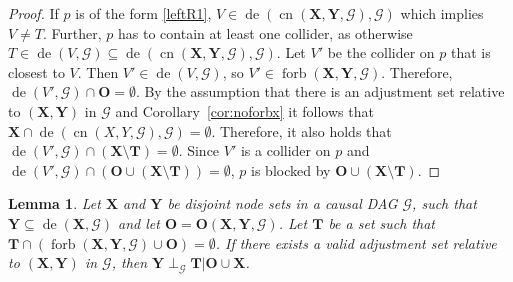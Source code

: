 \documentclass[11pt,a4paper]{article}
\newtheorem{Lemma}[Satz]{Lemma}
\theoremstyle{definition}
\theoremstyle{remark}
\DeclareMathOperator{\Forbb}{forb}
\DeclareMathOperator{\de}{de}
\DeclareMathOperator{\CN}{cn}
\newcommand{\g}[1][G]{\mathcal{#1}}
\newcommand{\fb}[2][X,Y]{\Forbb(\mathbf{#1},#2)}
\newcommand{\cn}[2][X,Y]{\CN(#1,#2)}
\newcommand{\cnb}[2][X,Y]{\CN(\mathbf{#1},#2)}
\newcommand{\optb}[2][X,Y]{\mathbf{O}(\mathbf{#1},#2)}
\begin{document}
\begin{proof}
	If $p$ is of the form \ref{leftR1}, $V \in \de(\cnb{\g},\g)$ which implies $V \neq T$. Further, $p$ has to contain at least one collider, as otherwise $T \in \de(V,\g) \subseteq \de(\cnb{\g},\g)$. Let $V'$ be the collider on $p$ that is closest to $V$.  Then $V' \in \de(V,\g)$, so $V' \in \fb{\g}$. Therefore, $\de(V',\g) \cap \mathbf{O} = \emptyset$. 
	By the assumption that there is an adjustment set relative to $(\mathbf{X,Y})$ in $\g$ and Corollary~\ref{cor:noforbx} it follows that $\mathbf{X} \cap \de(\cn{\g},\g) = \emptyset$. Therefore, it also holds that $\de(V',\g) \cap (\mathbf{X} \setminus \mathbf{T}) = \emptyset$. 
	Since $V'$ is a collider on $p$ and $\de(V',\g) \cap ( \mathbf{O} \cup (\mathbf{X} \setminus \mathbf{T})) = \emptyset$, $p$ is blocked by $\mathbf{O} \cup (\mathbf{X} \setminus \mathbf{T})$.
\end{proof}

\begin{Lemma}
	Let $\mathbf{X}$ and $\mathbf{Y}$ be disjoint node sets in a causal DAG $\g$, such that $\mathbf{Y} \subseteq \de(\mathbf{X},\g)$ and let $\mathbf{O}=\optb{\g}$. Let $\mathbf{T}$ be a set such that 
	$\mathbf{T} \cap (\fb{\g} \cup \mathbf{O}) = \emptyset$. If there exists a valid adjustment set relative to $(\mathbf{X},\mathbf{Y})$ in $\g$, then $\mathbf{Y} \perp_{\g}\mathbf{T}|\mathbf{O} \cup \mathbf{X}$.  
	\label{y-separation}
\end{Lemma}
\end{document}

